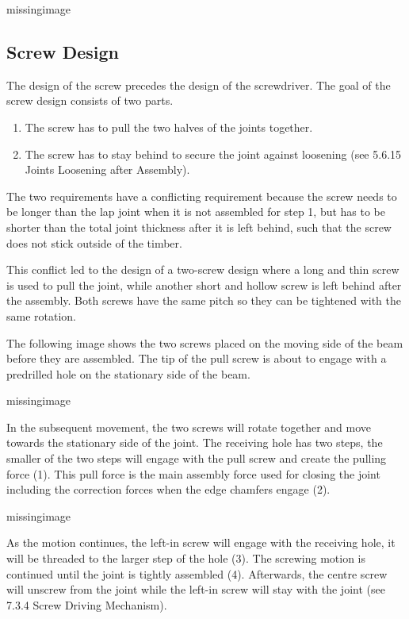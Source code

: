 missingimage

\subsection{Screw Design}
The design of the screw precedes the design of the screwdriver. The goal of the screw design consists of two parts. 

\begin{enumerate}
    \item The screw has to pull the two halves of the joints together.
    \item The screw has to stay behind to secure the joint against loosening (see 5.6.15 Joints Loosening after Assembly).

\end{enumerate}
The two requirements have a conflicting requirement because the screw needs to be longer than the lap joint when it is not assembled for step 1, but has to be shorter than the total joint thickness after it is left behind, such that the screw does not stick outside of the timber. 

This conflict led to the design of a two-screw design where a long and thin screw is used to pull the joint, while another short and hollow screw is left behind after the assembly. Both screws have the same pitch so they can be tightened with the same rotation.

The following image shows the two screws placed on the moving side of the beam before they are assembled. The tip of the pull screw is about to engage with a predrilled hole on the stationary side of the beam.

missingimage

In the subsequent movement, the two screws will rotate together and move towards the stationary side of the joint. The receiving hole has two steps, the smaller of the two steps will engage with the pull screw and create the pulling force (1). This pull force is the main assembly force used for closing the joint including the correction forces when the edge chamfers engage (2).

missingimage


As the motion continues, the left-in screw will engage with the receiving hole, it will be threaded to the larger step of the hole (3). The screwing motion is continued until the joint is tightly assembled (4). Afterwards, the centre screw will unscrew from the joint while the left-in screw will stay with the joint (see 7.3.4 Screw Driving Mechanism).

